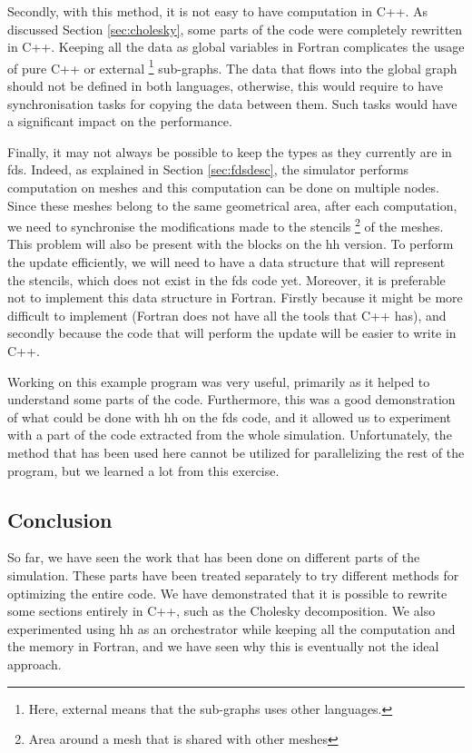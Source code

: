 Secondly, with this method, it is not easy to have computation in C++. As
discussed Section \ref{sec:cholesky}, some parts of the code were completely
rewritten in C++. Keeping all the data as global variables in Fortran
complicates the usage of pure C++ or external \footnote{Here, external means
that the sub-graphs uses other languages.} sub-graphs. The data that flows into
the global graph should not be defined in both languages, otherwise, this would
require to have synchronisation tasks for copying the data between them. Such
tasks would have a significant impact on the performance.

Finally, it may not always be possible to keep the types as they currently are
in \gls{fds}. Indeed, as explained in Section \ref{sec:fdsdesc}, the simulator
performs computation on meshes and this computation can be done on multiple
nodes. Since these meshes belong to the same geometrical area, after each
computation, we need to synchronise the modifications made to the
stencils \footnote{Area around a mesh that is shared with other meshes} of the
meshes. This problem will also be present with the blocks on the \gls{hh}
version. To perform the update efficiently, we will need to have a data
structure that will represent the stencils, which does not
exist in the \gls{fds} code yet. Moreover, it is preferable not to implement
this data structure in Fortran. Firstly because it might be more difficult to
implement (Fortran does not have all the tools that C++ has), and secondly
because the code that will perform the update will be easier to write in C++.

Working on this example program was very useful, primarily as it helped to
understand some parts of the code. Furthermore, this was a good demonstration
of what could be done with \gls{hh} on the \gls{fds} code, and it allowed us to
experiment with a part of the code extracted from the whole simulation.
Unfortunately, the method that has been used here cannot be utilized for
parallelizing the rest of the program, but we learned a lot from this exercise.

\subsection{Conclusion}
\label{sec:fdsconcl}

So far, we have seen the work that has been done on different parts of the
simulation. These parts have been treated separately to try different methods
for optimizing the entire code. We have demonstrated that it is possible to
rewrite some sections entirely in C++, such as the Cholesky decomposition. We
also experimented using \gls{hh} as an orchestrator while keeping all the
computation and the memory in Fortran, and we have seen why this is eventually
not the ideal approach.

